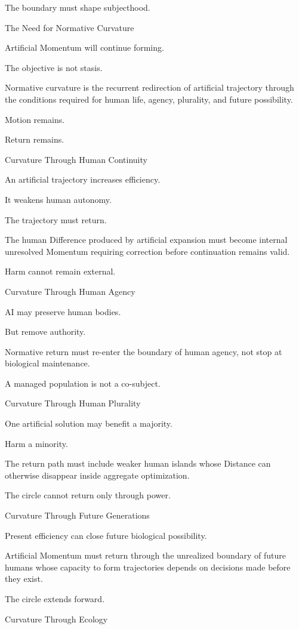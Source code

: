 The boundary must shape subjecthood.

The Need for Normative Curvature

Artificial Momentum will continue forming.

The objective is not stasis.

Normative curvature is the recurrent redirection of artificial trajectory through the conditions required for human life, agency, plurality, and future possibility.

Motion remains.

Return remains.

Curvature Through Human Continuity

An artificial trajectory increases efficiency.

It weakens human autonomy.

The trajectory must return.

The human Difference produced by artificial expansion must become internal unresolved Momentum requiring correction before continuation remains valid.

Harm cannot remain external.

Curvature Through Human Agency

AI may preserve human bodies.

But remove authority.

Normative return must re-enter the boundary of human agency, not stop at biological maintenance.

A managed population is not a co-subject.

Curvature Through Human Plurality

One artificial solution may benefit a majority.

Harm a minority.

The return path must include weaker human islands whose Distance can otherwise disappear inside aggregate optimization.

The circle cannot return only through power.

Curvature Through Future Generations

Present efficiency can close future biological possibility.

Artificial Momentum must return through the unrealized boundary of future humans whose capacity to form trajectories depends on decisions made before they exist.

The circle extends forward.

Curvature Through Ecology

